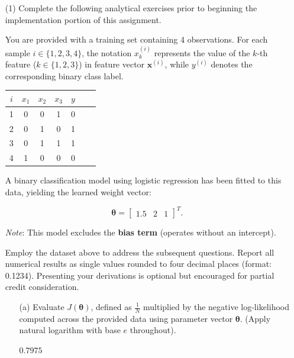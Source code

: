 \documentclass[11pt,addpoints,answers]{exam}
\newcommand{\xv}{\mathbf{x}}
\newcommand{\thetav}{\boldsymbol{\theta}}
\begin{document}
	\begin{enumerate}
		\item[(1)] Complete the following analytical exercises prior to beginning the implementation portion of this assignment.
		
		You are provided with a training set containing 4 observations. For each sample $i \in \{1, 2, 3, 4\}$, the notation $x_k^{(i)}$ represents the value of the $k$-th feature ($k \in \{1, 2, 3\}$) in feature vector $\xv^{(i)}$, while $y^{(i)}$ denotes the corresponding binary class label.
		
		\begin{center}
			\begin{tabular}{|c|c|c|c|c|c|c|}
				\hline
				$i$ & $x_{1}$ & $x_{2}$ & $x_{3}$ & $y$ \\ \hline
				1   & 0       &       0 &       1 & 0   \\ \hline
				2   & 0       &       1 &       0 & 1   \\ \hline
				3   & 0       &       1 &       1 & 1   \\ \hline
				4   & 1       &       0 &       0 & 0   \\ \hline
				
			\end{tabular}
		\end{center}
		
		A binary classification model using logistic regression has been fitted to this data, yielding the learned weight vector:
		
		\[\thetav = \begin{bmatrix}1.5 & 2 & 1\end{bmatrix}^T.\]
		
		\textit{Note}: This model excludes the \textbf{bias term} (operates without an intercept).
		
		Employ the dataset above to address the subsequent questions. Report all numerical results as single values rounded to four decimal places (format: 0.1234). Presenting your derivations is optional but encouraged for partial credit consideration.
		
		\begin{enumerate}[label=\alph*), itemsep=10pt]
			\item[(a)] Evaluate $J(\thetav)$, defined as $\frac{1}{N}$ multiplied by the negative log-likelihood computed across the provided data using parameter vector $\thetav$. (Apply natural logarithm with base $e$ throughout).
			
			\begin{your_solution}[title=$J(\thetav)$,height=2cm,width=3cm]
				$0.7975$
			\end{your_solution}
			

\end{enumerate}
\end{enumerate}
\end{document}
